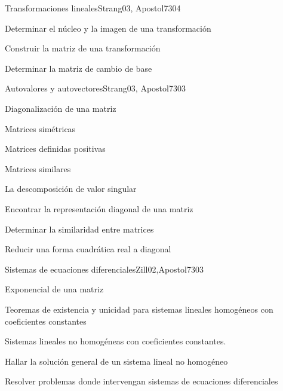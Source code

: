 \begin{syllabus}
\begin{unit}{Transformaciones lineales}{Strang03, Apostol73}{0}{4}
   \begin{learningoutcomes}
      \item Determinar el núcleo y la imagen de una transformación
      \item Construir la matriz de una transformación
      \item Determinar la matriz de cambio de base
      \end{learningoutcomes}
\end{unit}

\begin{unit}{Autovalores y autovectores}{Strang03, Apostol73}{0}{3}
\begin{topics}
      \item Diagonalización de una matriz
      \item Matrices simétricas
      \item Matrices definidas positivas
      \item Matrices similares
      \item La descomposición de valor singular
  \end{topics}

   \begin{learningoutcomes}
      \item Encontrar la representación diagonal de una matriz
      \item Determinar la similaridad entre matrices
      \item Reducir una forma cuadrática real a diagonal
   \end{learningoutcomes}
\end{unit}

\begin{unit}{Sistemas de ecuaciones diferenciales}{Zill02,Apostol73}{0}{3}
\begin{topics}
      \item Exponencial de una matriz
      \item Teoremas de existencia y unicidad para sistemas lineales homogéneos con coeficientes constantes
      \item Sistemas lineales no homogéneas con coeficientes constantes.
    \end{topics}

   \begin{learningoutcomes}
      \item Hallar la solución general de un sistema lineal no  homogéneo
      \item Resolver problemas donde intervengan sistemas de ecuaciones diferenciales
   \end{learningoutcomes}
\end{unit}


\end{syllabus}
